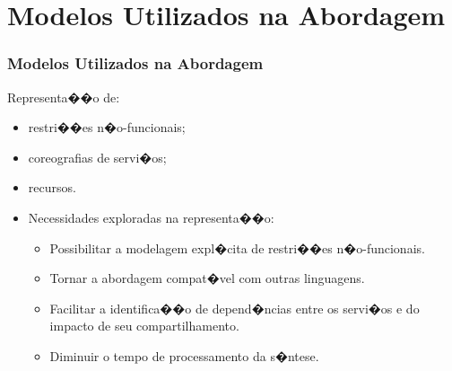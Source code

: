 \documentclass[compress]{beamer}
\newcommand{\semitransp}[2][35]{\textcolor{fg!#1}#2}
\begin{document}
\section[\thesection]{Modelos Utilizados na Abordagem}
\frame
{
 \frametitle{Modelos Utilizados na Abordagem}
\begin{block}{Representa��o de:}
\footnotesize
\begin{itemize}
 \item restri��es n�o-funcionais;
 \item[\textcolor{fg!20}{\textbullet}] \semitransp[20]{{coreografias de servi�os;}}
 \item[\textcolor{fg!20}{\textbullet}] \semitransp[20]{{recursos.}}
\end{itemize}
\end{block} 
\vspace{0.8cm}
\begin{itemize}
 \item Necessidades exploradas na representa��o:
\begin{itemize}
 \item Possibilitar a modelagem expl�cita de restri��es n�o-funcionais.
 \item[\textcolor{fg!20}{\textbullet}] \semitransp[20]{{Tornar a abordagem compat�vel com outras linguagens.}}
 \item[\textcolor{fg!20}{\textbullet}] \semitransp[20]{{Facilitar a identifica��o de depend�ncias entre os servi�os e do impacto de seu compartilhamento.}}
 \item[\textcolor{fg!20}{\textbullet}] \semitransp[20]{{Diminuir o tempo de processamento da s�ntese.}}
\end{itemize}
\end{itemize}
}
\end{document}
